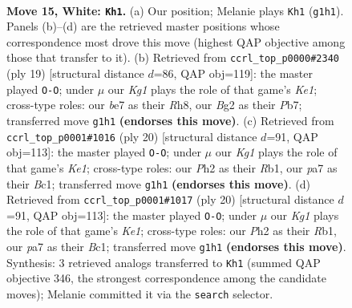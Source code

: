 \documentclass[11pt]{article}
\begin{document}
\clearpage

\begin{figure}[p]\centering
\begin{subfigure}{0.46\textwidth}\centering
\resizebox{\linewidth}{!}{%
\newchessgame
\chessboard[
  setfen={1rbq1r1k/pp2b2p/n1p3p1/3p1p1n/3P1P2/PQ3NP1/1P1NP1BP/R1B1R1K1 w - - 3 15},
  showmover=false,
  pgfstyle=straightmove, color=movearrow, markmove={g1-h1}
]}
\caption{}
\end{subfigure}\hfill
\begin{subfigure}{0.46\textwidth}\centering
\resizebox{\linewidth}{!}{%
\newchessgame
\chessboard[
  setfen={2r1k2r/pp1bbppp/2np1n2/q1p1p3/4P3/1BPP1N1P/PP3PP1/RNBQR1K1 b k - 0 10},
  showmover=false,
  pgfstyle=straightmove, color=movearrow, markmove={e8-g8}
]}
\caption{}
\end{subfigure}
\\[4pt]
\begin{subfigure}{0.46\textwidth}\centering
\resizebox{\linewidth}{!}{%
\newchessgame
\chessboard[
  setfen={r1bq1rk1/ppp3bp/2np2p1/5p1n/1PPPp2P/2N1P1P1/P3NPB1/1RBQK2R w K - 3 11},
  showmover=false,
  pgfstyle=straightmove, color=movearrow, markmove={e1-g1}
]}
\caption{}
\end{subfigure}\hfill
\begin{subfigure}{0.46\textwidth}\centering
\resizebox{\linewidth}{!}{%
\newchessgame
\chessboard[
  setfen={r1bq1rk1/ppp3bp/2np2p1/5p1n/1PPPp2P/2N1P1P1/P3NPB1/1RBQK2R w K - 3 11},
  showmover=false,
  pgfstyle=straightmove, color=movearrow, markmove={e1-g1}
]}
\caption{}
\end{subfigure}
\caption{\textbf{Move 15, White: \texttt{Kh1}.} (a) Our position; Melanie plays \texttt{Kh1} (\texttt{g1h1}). Panels (b)--(d) are the retrieved master positions whose correspondence most drove this move (highest QAP objective among those that transfer to it). (b) Retrieved from \texttt{ccrl\_top\_p0000\#2340} (ply 19) [structural distance $d$=86, QAP obj=119]: the master played \texttt{O-O}; under $\mu$ our \emph{Kg1} plays the role of that game's \emph{Ke1}; cross-type roles: our \emph{b}e7 as their \emph{R}h8, our \emph{B}g2 as their \emph{P}b7; transferred move \texttt{g1h1} \textbf{(endorses this move)}. (c) Retrieved from \texttt{ccrl\_top\_p0001\#1016} (ply 20) [structural distance $d$=91, QAP obj=113]: the master played \texttt{O-O}; under $\mu$ our \emph{Kg1} plays the role of that game's \emph{Ke1}; cross-type roles: our \emph{P}h2 as their \emph{R}b1, our \emph{p}a7 as their \emph{B}c1; transferred move \texttt{g1h1} \textbf{(endorses this move)}. (d) Retrieved from \texttt{ccrl\_top\_p0001\#1017} (ply 20) [structural distance $d$=91, QAP obj=113]: the master played \texttt{O-O}; under $\mu$ our \emph{Kg1} plays the role of that game's \emph{Ke1}; cross-type roles: our \emph{P}h2 as their \emph{R}b1, our \emph{p}a7 as their \emph{B}c1; transferred move \texttt{g1h1} \textbf{(endorses this move)}. Synthesis: 3 retrieved analogs transferred to \texttt{Kh1} (summed QAP objective 346, the strongest correspondence among the candidate moves); Melanie committed it via the \texttt{search} selector.}
\label{fig:thought-m28}
\end{figure}
\end{document}
